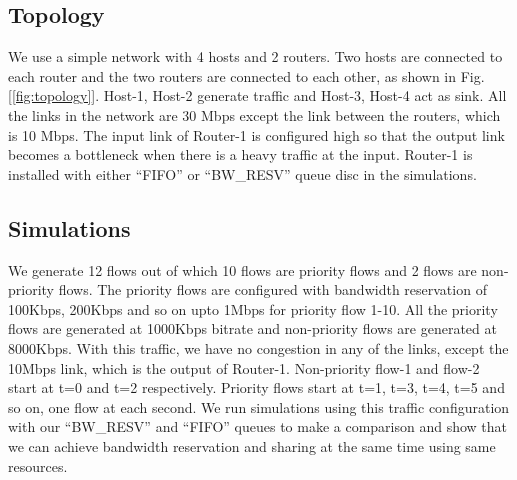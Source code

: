 \documentclass[conference]{IEEEtran}
\begin{document}
\subsection{Topology}
We use a simple network with 4 hosts and 2 routers. Two hosts are connected to each router and the two routers are connected to each 
other, as shown in Fig. [\ref{fig:topology}]. Host-1, Host-2 generate traffic and Host-3, Host-4 act as sink. All the links in the network are 30 Mbps except the link between the routers, which is 10 Mbps. The input link of Router-1 is configured high so that the output link becomes a bottleneck when there is a heavy traffic at the input. Router-1 is installed with either ``FIFO'' or ``BW\_RESV'' queue disc in the simulations.

\subsection{Simulations}
We generate 12 flows out of which 10 flows are priority flows and 2 flows are non-priority flows. The priority flows are configured with bandwidth reservation of 100Kbps, 200Kbps and so on upto 1Mbps for priority flow 1-10. All the priority flows are generated at 1000Kbps bitrate and non-priority flows are generated at 8000Kbps. With this traffic, we have no congestion in any of the links, except the 10Mbps link, which is the output of Router-1. Non-priority flow-1 and flow-2 start at t=0 and t=2 respectively. Priority flows start at t=1, t=3, t=4, t=5 and so on, one flow at each second. We run simulations using this traffic configuration with our ``BW\_RESV'' and ``FIFO'' queues to make a comparison and show that we can achieve bandwidth reservation and sharing at the same time using same resources.
\end{document}
